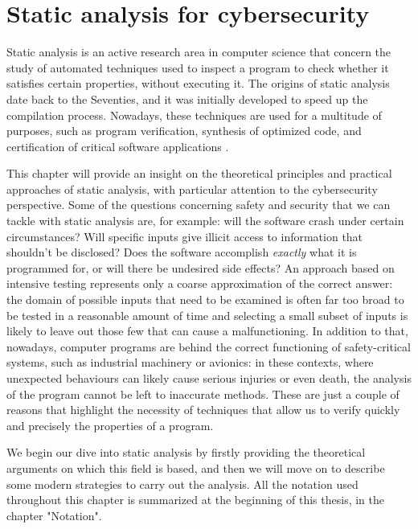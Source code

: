\documentclass[12pt,a4paper]{book}
\theoremstyle{definition}
\begin{document}
	\chapter{Static analysis for cybersecurity}\label{chapter:static_analysis}
	Static analysis is an active research area in computer science that concern the study of automated techniques used to inspect a program to check whether it satisfies certain properties, without executing it. The origins of static analysis date back to the Seventies, and it was initially developed to speed up the compilation process. Nowadays, these techniques are used for a multitude of purposes, such as program verification, synthesis of optimized code, and certification of critical software applications \cite{Rival2020}. 
	
	This chapter will provide an insight on the theoretical principles and practical approaches of static analysis, with particular attention to the cybersecurity perspective. Some of the questions concerning safety and security that we can tackle with static analysis are, for example: will the software crash under certain circumstances? Will specific inputs give illicit access to information that shouldn't be disclosed? Does the software accomplish \textit{exactly} what it is programmed for, or will there be undesired side effects? An approach based on intensive testing represents only a coarse approximation of the correct answer: the domain of possible inputs that need to be examined is often far too broad to be tested in a reasonable amount of time and selecting a small subset of inputs is likely to leave out those few that can cause a malfunctioning. In addition to that, nowadays, computer programs are behind the correct functioning of safety-critical systems, such as industrial machinery or avionics: in these contexts, where unexpected behaviours can likely cause serious injuries or even death, the analysis of the program cannot be left to inaccurate methods. These are just a couple of reasons that highlight the necessity of techniques that allow us to verify quickly and precisely the properties of a program.
	
	We begin our dive into static analysis by firstly providing the theoretical arguments on which this field is based, and then we will move on to describe some modern strategies to carry out the analysis. All the notation used throughout this chapter is summarized at the beginning of this thesis, in the chapter "Notation".
\end{document}
